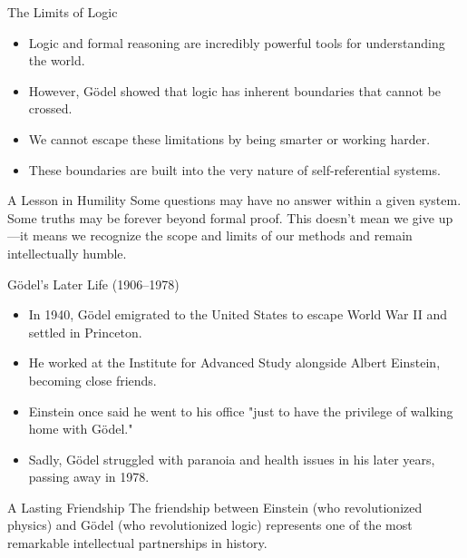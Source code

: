\documentclass[aspectratio=169]{beamer}
\begin{document}
\begin{frame}{The Limits of Logic}

\begin{itemize}
    \item Logic and formal reasoning are incredibly powerful tools for understanding the world.
    \item However, Gödel showed that logic has inherent boundaries that cannot be crossed.
    \item We cannot escape these limitations by being smarter or working harder.
    \item These boundaries are built into the very nature of self-referential systems.
\end{itemize}

\begin{block}{A Lesson in Humility}
Some questions may have no answer within a given system. Some truths may be forever beyond formal proof. This doesn't mean we give up—it means we recognize the scope and limits of our methods and remain intellectually humble.
\end{block}

\end{frame}

\begin{frame}{Gödel's Later Life (1906--1978)}

\begin{itemize}
    \item In 1940, Gödel emigrated to the United States to escape World War II and settled in Princeton.
    \item He worked at the Institute for Advanced Study alongside Albert Einstein, becoming close friends.
    \item Einstein once said he went to his office "just to have the privilege of walking home with Gödel."
    \item Sadly, Gödel struggled with paranoia and health issues in his later years, passing away in 1978.
\end{itemize}

\begin{block}{A Lasting Friendship}
The friendship between Einstein (who revolutionized physics) and Gödel (who revolutionized logic) represents one of the most remarkable intellectual partnerships in history.
\end{block}

\end{frame}
\end{document}
